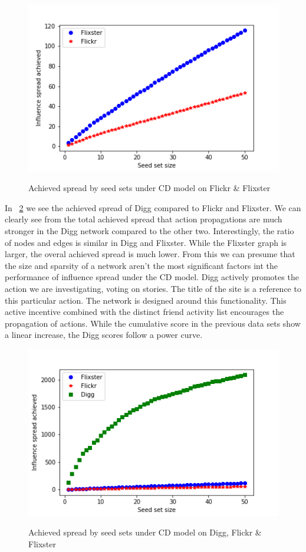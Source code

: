 \documentclass{acm_proc_article-sp}
\begin{document}
\begin{figure}[h]
	\includegraphics[width=\linewidth]{spread2.png}
	\centering
	\label{spread2}
	\caption{Achieved spread by seed sets under CD model on Flickr \& Flixster}
\end{figure}

In ~\ref{spread3} we see the achieved spread of Digg compared to Flickr and Flixster. We can clearly see from the total achieved spread that action propagations are much stronger in the Digg network compared to the other two. Interestingly, the ratio of nodes and edges is similar in Digg and Flixster. While the Flixster graph is larger, the overal achieved spread is much lower. From this we can presume that the size and sparsity of a network aren't the most significant factors int the performance of influence spread under the CD model. Digg actively promotes the action we are investigating, voting on stories. The title of the site is a reference to this particular action. The network is designed around this functionality. This active incentive combined with the distinct friend activity list encourages the propagation of actions. While the cumulative score in the previous data sets show a linear increase, the Digg scores follow a power curve.

\begin{figure}[h]
	\includegraphics[width=\linewidth]{spread3.png}
	\centering
	\label{spread3}
    \caption{Achieved spread by seed sets under CD model on Digg, Flickr \& Flixster}
\end{figure}
\end{document}
